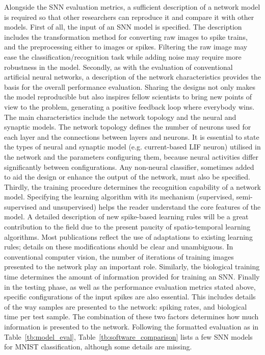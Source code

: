 Alongside the SNN evaluation metrics, a sufficient description of a network model is required so that other researchers can reproduce it and compare it with other models.
First of all, the input of an SNN model is specified.
The description includes the transformation method for converting raw images to spike trains, and the preprocessing either to images or spikes.
Filtering the raw image may ease the classification/recognition task while adding noise may require more robustness in the model.
Secondly, as with the evaluation of conventional artificial neural networks, a description of the network characteristics provides the basis for the overall performance evaluation.
Sharing the designs not only makes the model reproducible but also inspires fellow scientists to bring new points of view to the problem, generating a positive feedback loop where everybody wins.
The main characteristics include the network topology and the neural and synaptic models.
The network topology defines the number of neurons used for each layer and the connections between layers and neurons.
It is essential to state the types of neural and synaptic model (e.g. current-based LIF neuron) utilised in the network and the parameters configuring them, because neural activities differ significantly between configurations.
Any non-neural classifier, sometimes added to aid the design or enhance the output of the network, must also be specified.
Thirdly, the training procedure determines the recognition capability of a network model.
Specifying the learning algorithm with its mechanism (supervised, semi-supervised and unsupervised) helps the reader understand the core features of the model.
A detailed description of new spike-based learning rules will be a great contribution to the field due to the present paucity of spatio-temporal learning algorithms.
Most publications reflect the use of adaptations to existing learning rules; details on these modifications should be clear and unambiguous.
In conventional computer vision, the number of iterations of training images presented to the network play an important role.
Similarly, the biological training time determines the amount of information provided for training an SNN.
Finally in the testing phase, as well as the performance evaluation metrics stated above, specific configurations of the input spikes are also essential.
This includes details of the way samples are presented to the network: spiking rates, and biological time per test sample.
The combination of these two factors determines how much information is presented to the network.
Following  the formatted evaluation as in Table~\ref{tb:model_eval}, Table~\ref{tb:software_comparison} lists a few SNN models  for MNIST classification, although some details are missing. 

